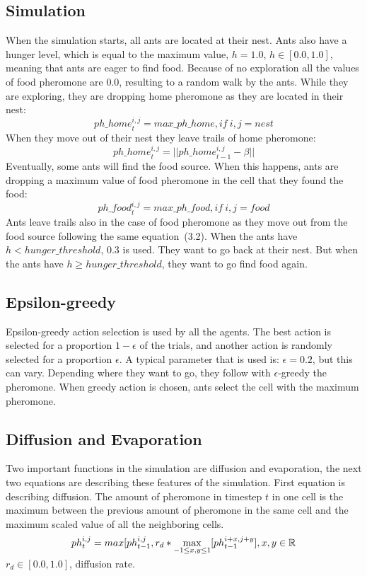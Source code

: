 \documentclass[paper=a4, fontsize=11pt]{scrartcl} %
\numberwithin{equation}{section} %
\numberwithin{figure}{section} %
\numberwithin{table}{section} %
\begin{document}
\subsection{Simulation}
When the simulation starts, all ants are located at their nest. Ants also have a hunger level, which is equal to the maximum value, $h = 1.0$, $h \in [0.0,1.0]$, meaning that ants are eager to find food. Because of no exploration all the values of food pheromone are $0.0$, resulting to a random walk by the ants. While they are exploring, they are dropping home pheromone as they are located in their nest:
\begin{equation}
{ph\_{home}}_t^{i,j} = max\_ph\_home, if\ i,j = nest
\end{equation}
When they move out of their nest they leave trails of home pheromone:
\begin{equation}
{ph\_{home}}_t^{i,j} = ||{ph\_{home}}_{t-1}^{i,j} - \beta||
\end{equation}
Eventually, some ants will find the food source. When this happens, ants are dropping a maximum value of food pheromone in the cell that they found the food:
\begin{equation}
{ph\_{food}}_t^{i,j} = max\_ph\_food, if\ i,j = food
\end{equation}
Ants leave trails also in the case of food pheromone as they move out from the food source following the same equation~(3.2).
When the ants have $h < hunger\_threshold$, $0.3$ is used. They want to go back at their nest. But when the ants have $h \geq hunger\_threshold$, they want to go find food again.

\subsection{Epsilon-greedy}
Epsilon-greedy action selection is used by all the agents. The best action is selected for a proportion $1 - \epsilon$ of the trials, and another action is randomly selected for a proportion $\epsilon$. A typical parameter that is used is: $\epsilon = 0.2$, but this can vary. Depending where they want to go, they follow with $\epsilon$-greedy the pheromone. When greedy action is chosen, ants select the cell with the maximum pheromone.


\subsection{Diffusion and Evaporation}
Two important functions in the simulation are diffusion and evaporation, the next two equations are describing these features of the simulation. First equation is describing diffusion. The amount of pheromone in timestep $t$ in one cell is the maximum between the previous amount of pheromone in the same cell and the maximum scaled value of all the neighboring cells.
\begin{equation}
{ph}_t^{i,j} = max[{ph}_{t-1}^{i,j}, r_d * \smash{\displaystyle\max_{-1 \leq x,y \leq 1}}[{ph}_{t-1}^{i+x,j+y}], x,y \in \mathbb{R}
\end{equation}
$r_d \in [0.0,1.0]$, diffusion rate.\\
\end{document}
